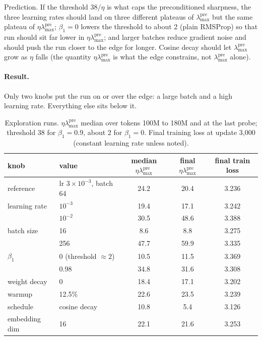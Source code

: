 \documentclass[10pt,letterpaper]{article}
\newcommand{\lmax}{\lambda_{\max}}
\begin{document}
Prediction. If the threshold $38/\eta$ is what caps the preconditioned sharpness, the three learning rates should land on three different plateaus of $\lmax^{\mathrm{pre}}$ but the same plateau of $\eta\lmax^{\mathrm{pre}}$; $\beta_1=0$ lowers the threshold to about 2 (plain RMSProp) so that run should sit far lower in $\eta\lmax^{\mathrm{pre}}$; and larger batches reduce gradient noise and should push the run closer to the edge for longer. Cosine decay should let $\lmax^{\mathrm{pre}}$ grow as $\eta$ falls (the quantity $\eta\lmax^{\mathrm{pre}}$ is what the edge constrains, not $\lmax^{\mathrm{pre}}$ alone).


\paragraph{Result.} Only two knobs put the run on or over the edge: a large batch and a high learning rate. Everything else sits below it.

\begin{table}[H]\centering\small
\caption{Exploration runs. $\eta\lmax^{\mathrm{pre}}$ median over tokens 100M to 180M and at the last probe; threshold 38 for $\beta_1=0.9$, about 2 for $\beta_1=0$. Final training loss at update 3,000 (constant learning rate unless noted).}
\begin{tabular}{llccc}\toprule
knob & value & median $\eta\lmax^{\mathrm{pre}}$ & final $\eta\lmax^{\mathrm{pre}}$ & final train loss\\\midrule
reference & lr $3\times10^{-3}$, batch 64 & 24.2 & 20.4 & 3.236\\
learning rate & $10^{-3}$ & 19.4 & 17.1 & 3.242\\
 & $10^{-2}$ & 30.5 & 48.6 & 3.388\\
batch size & 16 & 8.6 & 8.8 & 3.275\\
 & 256 & 47.7 & 59.9 & 3.335\\
$\beta_1$ & 0 (threshold $\approx 2$) & 10.5 & 11.5 & 3.369\\
 & 0.98 & 34.8 & 31.6 & 3.308\\
weight decay & 0 & 18.4 & 17.1 & 3.202\\
warmup & 12.5\% & 22.6 & 23.5 & 3.239\\
schedule & cosine decay & 10.8 & 5.4 & 3.126\\
embedding dim & 16 & 22.1 & 21.6 & 3.253\\
\bottomrule\end{tabular}\end{table}
\end{document}
